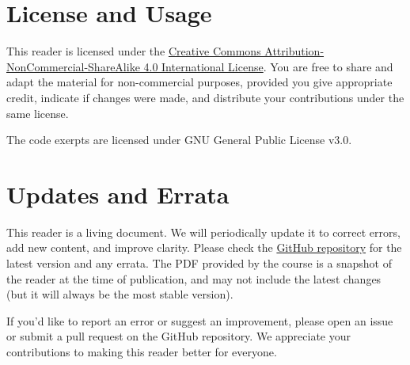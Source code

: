 \section*{License and Usage}
This reader is licensed under the \href{https://creativecommons.org/licenses/by-nc-sa/4.0/}{Creative Commons Attribution-NonCommercial-ShareAlike 4.0 International License}. You are free to share and adapt the material for non-commercial purposes, provided you give appropriate credit, indicate if changes were made, and distribute your contributions under the same license.

The code exerpts are licensed under GNU General Public License v3.0.

\section*{Updates and Errata}
This reader is a living document. We will periodically update it to correct errors, add new content, and improve clarity. Please check the \href{https://github.com/Code-For-Groningen/CN-Reader}{GitHub repository} for the latest version and any errata. The PDF provided by the course is a snapshot of the reader at the time of publication, and may not include the latest changes (but it will always be the most stable version).

If you'd like to report an error or suggest an improvement, please open an issue or submit a pull request on the GitHub repository. We appreciate your contributions to making this reader better for everyone.
